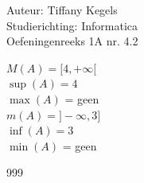 \documentclass[a4paper]{article}
\begin{document}
  
\noindent \large Auteur: Tiffany Kegels \\
\noindent \large Studierichting: Informatica\\
\noindent \large Oefeningenreeks 1A nr. 4.2\\

\medskip

\normalsize

$M(A) = [4,+\infty[$\\

$\sup(A) = 4$\\

$\max (A)$ = geen\\

$m(A) = ]-\infty, 3]$\\

$\inf(A) = 3$\\

$\min(A)$ = geen\\



\begin{thebibliography}{999}

\end{thebibliography}
\end{document}
